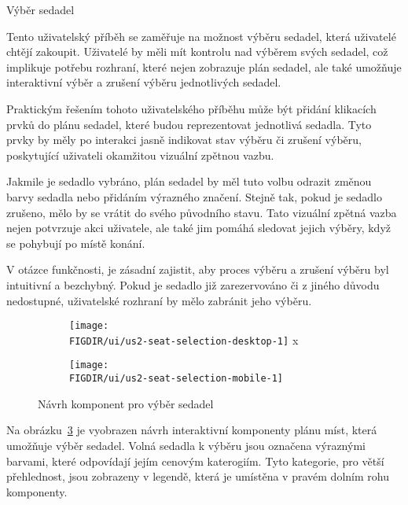\begin{subsection}{Výběr sedadel}
    \label{subsec:narvh-ui-transformace-uzivatelskych-pribehu-vyber-sedadel}
    \userstoryseatselection

    Tento uživatelský příběh se zaměřuje na možnost výběru sedadel, která uživatelé chtějí zakoupit.
    Uživatelé by měli mít kontrolu nad výběrem svých sedadel, což implikuje potřebu rozhraní, které nejen zobrazuje plán sedadel, ale také umožňuje interaktivní výběr a zrušení výběru jednotlivých sedadel.

    Praktickým řešením tohoto uživatelského příběhu může být přidání klikacích prvků do plánu sedadel, které budou reprezentovat jednotlivá sedadla.
    Tyto prvky by měly po interakci jasně indikovat stav výběru či zrušení výběru, poskytující uživateli okamžitou vizuální zpětnou vazbu.

    Jakmile je sedadlo vybráno, plán sedadel by měl tuto volbu odrazit změnou barvy sedadla nebo přidáním výrazného značení.
    Stejně tak, pokud je sedadlo zrušeno, mělo by se vrátit do svého původního stavu.
    Tato vizuální zpětná vazba nejen potvrzuje akci uživatele, ale také jim pomáhá sledovat jejich výběry, když se pohybují po místě konání.

    V otázce funkčnosti, je zásadní zajistit, aby proces výběru a zrušení výběru byl intuitivní a bezchybný.
    Pokud je sedadlo již zarezervováno či z jiného důvodu nedostupné, uživatelské rozhraní by mělo zabránit jeho výběru.

    \begin{figure}[H]
        \centering
        \begin{subfigure}{0.775\textwidth}
            \texttt{[image: \\FIGDIR/ui/us2-seat-selection-desktop-1]}
            \label{fig:us2-seat-selection-desktop-1}x
        \end{subfigure}
        \begin{subfigure}{0.2\textwidth}
            \texttt{[image: \\FIGDIR/ui/us2-seat-selection-mobile-1]}
            \label{fig:us2-seat-selection-mobile-1}
        \end{subfigure}
        \caption{Návrh komponent pro výběr sedadel}
        \label{fig:us2-seat-selection}
    \end{figure}

    Na obrázku~\ref{fig:us2-seat-selection} je vyobrazen návrh interaktivní komponenty plánu míst, která umožňuje výběr sedadel.
    Volná sedadla k výběru jsou označena výraznými barvami, které odpovídají jejím cenovým katerogiím.
    Tyto kategorie, pro větší přehlednost, jsou zobrazeny v legendě, která je umístěna v pravém dolním rohu komponenty.


\end{subsection}
